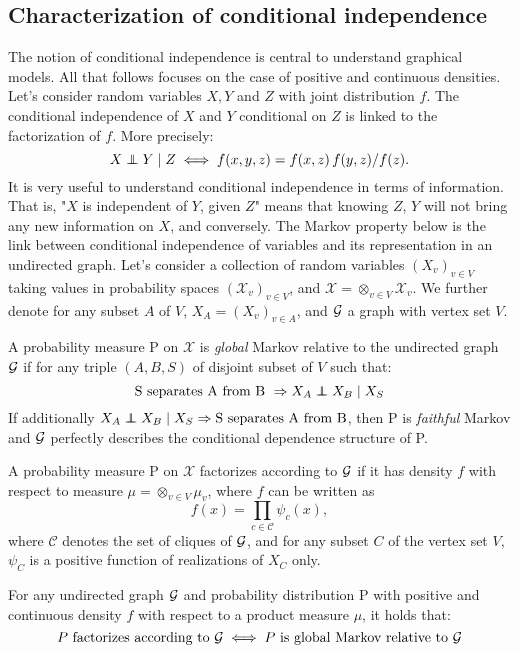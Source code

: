 \subsection{Characterization of conditional independence}
The notion of conditional independence is central to understand graphical models. All that follows focuses on the case of positive and continuous densities. Let's consider random variables $X,Y$ and $Z$ with joint distribution $f$. The conditional independence of $X$ and $Y$ conditional on $Z$ is linked to the factorization of $f$. More precisely: 
$$X \independent Y \mid Z \iff f(x,y,z) = f(x,z) \, f(y,z)/f(z). $$
It is very useful to understand conditional independence in terms of information. That is, "$X$ is independent of $Y$, given $Z$" means that knowing $Z$, $Y$ will not bring any new information on $X$, and conversely. The Markov property below is the link between conditional independence of variables and its representation in an undirected graph. Let's consider a collection of random variables $(X_v)_{v\in V}$ taking values in probability spaces $(\mathcal{X}_v)_{v\in V}$, and $\mathcal{X}=\otimes_{v\in V} \mathcal{X}_v$. We further denote for any subset $A$ of $V$, $X_A=(X_v)_{v\in A}$, and $\mathcal{G}$ a graph with vertex set $V$. 

\begin{definition}
A probability measure P on $\mathcal{X}$ is \textit{global} Markov relative to the undirected graph $\mathcal{G}$ if for any triple $(A, B, S)$ of disjoint subset of $V$ such that:
 $$ \text{S separates A from B } \Rightarrow X_A\independent X_B \mid X_S$$
 If additionally $X_A\independent X_B \mid X_S \Rightarrow \text{S separates A from B}  $, then P is \textit{faithful} Markov and $\mathcal{G}$ perfectly describes the conditional dependence structure of P.
\end{definition}
\begin{definition}[Factorization]
A probability measure P on $\mathcal{X}$ factorizes according to $\mathcal{G}$ if it has density $f$ with respect to measure $\mu = \otimes_{v\in V} \mu_v$, where $f$ can be written as
$$f(x) = \prod_{c\in \mathcal{C} }\psi_c(x),$$
where $\mathcal{C}$ denotes the set of cliques of $\mathcal{G}$, and for any subset $C$ of the vertex set $V$, $\psi_C$ is a positive function of realizations of $X_C$ only.
\end{definition}

\begin{theorem}
For any undirected graph $\mathcal{G}$ and probability distribution P with positive and continuous density $f$ with respect to a product measure $\mu$, it holds that:
$$P\text{ factorizes according to } \mathcal{G} \iff P\text{ is global Markov relative to }\mathcal{G} $$
\end{theorem}


